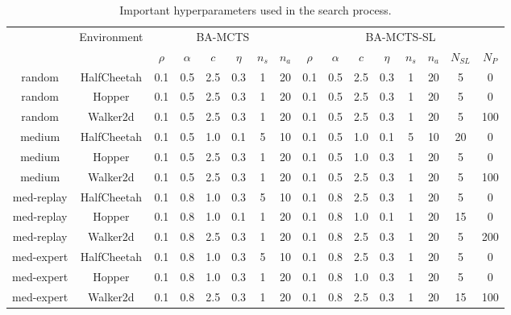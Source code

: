 \begin{table}[htbp]
\scriptsize
\centering
\begin{tabular}{|c|c|cccccc|cccccccc|}
\hline
{\multirow{2}{*}{\makecell{Data Type}}} & \multirow{2}{*}{Environment} & \multicolumn{6}{c|}{BA-MCTS} & \multicolumn{8}{c|}{BA-MCTS-SL} \\ \cline{3-16} & & $\rho$ & $\alpha$ & $c$ & $\eta$ & $n_s$ & $n_a$ & $\rho$ & $\alpha$ & $c$ & $\eta$ & $n_s$ & $n_a$ & $N_{SL}$ & $N_{P}$ \\ 
\hline
{random} & {HalfCheetah} & {0.1} & {0.5} & {2.5} & {0.3} & {1} & {20} & {0.1} & {0.5} & {2.5} & {0.3} & {1} & {20} & {5} & {0}\\
{random} & {Hopper} & {0.1} & {0.5} & {2.5} & {0.3} & {1} & {20} & {0.1} & {0.5} & {2.5} & {0.3} & {1} & {20} & {5} & {0}\\
{random} & {Walker2d} & {0.1} & {0.5} & {2.5} & {0.3} & {1} & {20} & {0.1} & {0.5} & {2.5} & {0.3} & {1} & {20} & {5} & {100}\\
\hline
{medium} & {HalfCheetah} & {0.1} & {0.5} & {1.0} & {0.1} & {5} & {10} & {0.1} & {0.5} & {1.0} & {0.1} & {5} & {10} & {20} & {0}\\
{medium} & {Hopper} & {0.1} & {0.5} & {2.5} & {0.3} & {1} & {20} & {0.1} & {0.5} & {1.0} & {0.3} & {1} & {20} & {5} & {0}\\
{medium} & {Walker2d} & {0.1} & {0.5} & {2.5} & {0.3} & {1} & {20} & {0.1} & {0.5} & {2.5} & {0.3} & {1} & {20} & {5} & {100}\\
\hline 
{med-replay} & {HalfCheetah} & {0.1} & {0.8} & {1.0} & {0.3} & {5} & {10} & {0.1} & {0.8} & {2.5} & {0.3} & {1} & {20} & {5} & {0}\\
{med-replay} & {Hopper} & {0.1} & {0.8} & {1.0} & {0.1} & {1} & {20} & {0.1} & {0.8} & {1.0} & {0.1} & {1} & {20} & {15} & {0}\\
{med-replay} & {Walker2d} & {0.1} & {0.8} & {2.5} & {0.3} & {1} & {20} & {0.1} & {0.8} & {2.5} & {0.3} & {1} & {20} & {5} & {200}\\
\hline 
{med-expert} & {HalfCheetah} & {0.1} & {0.8} & {1.0} & {0.3} & {5} & {10} & {0.1} & {0.8} & {2.5} & {0.3} & {1} & {20} & {5} & {0}\\
{med-expert} & {Hopper} & {0.1} & {0.8} & {1.0} & {0.3} & {1} & {20} & {0.1} & {0.8} & {1.0} & {0.3} & {1} & {20} & {5} & {0}\\
{med-expert} & {Walker2d} & {0.1} & {0.8} & {2.5} & {0.3} & {1} & {20} & {0.1} & {0.8} & {2.5} & {0.3} & {1} & {20} & {15} & {100}\\
\hline
\end{tabular}
\caption{Important hyperparameters used in the search process.}
\label{table:4}
\end{table}

